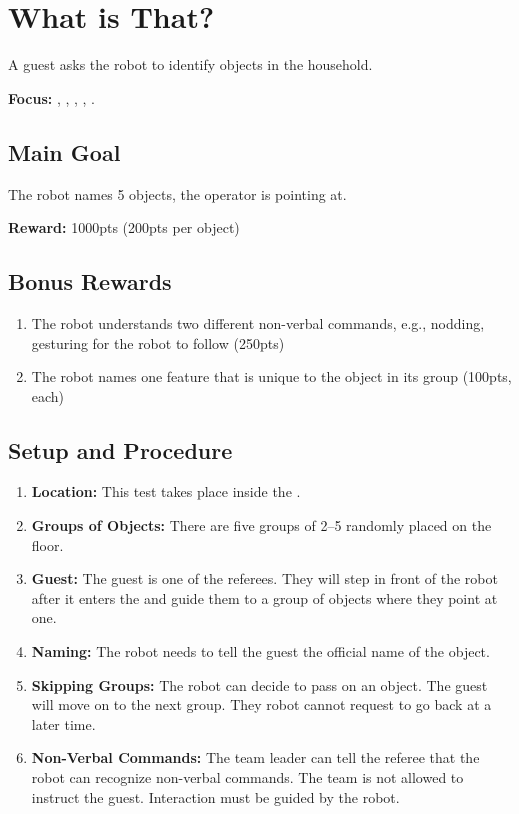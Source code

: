 \section{What is That?}
\label{test:what-is-that}
A guest asks the robot to identify objects in the household.

\noindent \textbf{Focus:} \SysI{}, \HRI{}, \GestRec{}, \CV{}, \OR{}.


\subsection*{Main Goal}
The robot names 5 objects, the operator is pointing at.

\noindent\textbf{Reward:} 1000pts (200pts per object)


\subsection*{Bonus Rewards}
\begin{enumerate}[nosep]
	\item The robot understands two different non-verbal commands, e.g., nodding, gesturing for the robot to follow (250pts)
	\item The robot names one feature that is unique to the object in its group (100pts, each)
\end{enumerate}


\subsection*{Setup and Procedure}
\begin{enumerate}[nosep]
	\item \textbf{Location:} This test takes place inside the \Arena{}.

	\item \textbf{Groups of Objects:} There are five groups of 2--5 \KnownObjects{} randomly placed on the floor.
	
	\item \textbf{Guest:} The guest is one of the referees. They will step in front of the robot after it enters the \Arena{} and guide them to a group of objects where they point at one.

	\item \textbf{Naming:} The robot needs to tell the guest the official name of the object.

	\item \textbf{Skipping Groups:} The robot can decide to pass on an object. The guest will move on to the next group. They robot cannot request to go back at a later time.
	
	\item \textbf{Non-Verbal Commands:} The team leader can tell the referee that the robot can recognize non-verbal commands. The team is not allowed to instruct the guest. Interaction must be guided by the robot.
\end{enumerate}


